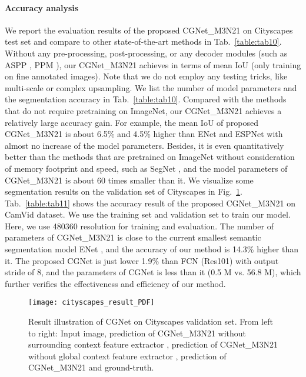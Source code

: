\documentclass[10pt,twocolumn,letterpaper]{article}
\begin{document}
\paragraph{Accuracy analysis}
We report the evaluation results of the proposed CGNet\_M3N21 on Cityscapes test set and compare to other state-of-the-art methods in Tab.~\ref{table:tab10}. Without any pre-processing, post-processing, or any decoder modules (such as ASPP \cite{chen2016deeplab}, PPM \cite{Zhao_2017_CVPR}), our CGNet\_M3N21 achieves  in terms of mean IoU (only training on fine annotated images). Note that we do not employ any testing tricks, like multi-scale or complex upsampling. We list the number of model parameters and the segmentation accuracy in Tab.~\ref{table:tab10}. Compared with the methods that do not require pretraining on ImageNet, our CGNet\_M3N21 achieves a relatively large accuracy gain. For example, the mean IoU of proposed CGNet\_M3N21 is about 6.5\%  and 4.5\% higher than ENet \cite{paszke2016enet} and ESPNet \cite{mehta2018espnet} with almost no increase of the model parameters. Besides, it is even quantitatively better than the methods that are pretrained on ImageNet without consideration of memory footprint and speed, such as SegNet \cite{badrinarayanan2017segnet}, and the model parameters of CGNet\_M3N21 is about 60 times smaller than it. We visualize some segmentation results on the validation set of Cityscapes in Fig.~\ref{fig:fig5}.
Tab.~\ref{table:tab11} shows the accuracy result of the proposed CGNet\_M3N21 on CamVid dataset. We use the training set and validation set to train our model. Here, we use 480360 resolution for training and evaluation. The number of parameters of CGNet\_M3N21 is close to the current smallest semantic segmentation model ENet \cite{paszke2016enet}, and the accuracy of our method is 14.3\% higher than it. The proposed CGNet is just lower 1.9\% than FCN (Res101) with output stride of 8, and the parameters of CGNet is  less than it (0.5 M vs. 56.8 M), which further verifies the effectiveness and efficiency of our method.




\begin{figure}[t]
\centering
\texttt{[image: cityscapes\_result\_PDF]}
\caption{Result illustration of CGNet on Cityscapes validation set. From left to right: Input image, prediction of CGNet\_M3N21 without surrounding context feature extractor , prediction of CGNet\_M3N21 without global context feature extractor , prediction of CGNet\_M3N21 and ground-truth.}
\label{fig:fig5}
\vspace{-15pt}
\end{figure}
\end{document}
